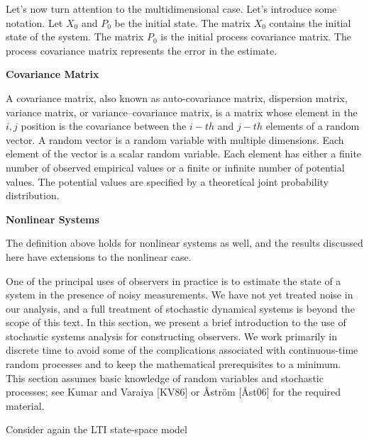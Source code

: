 Let's now turn attention to the multidimensional case. Let's introduce some notation. Let $X_0$ and $P_0$ be the initial state.
The matrix $X_0$ contains the initial state of the system. The matrix $P_0$ is the initial process covariance matrix. The process
covariance matrix represents the error in the estimate.


\begin{framed}
\theoremstyle{remark}
\begin{remark}{\textbf{Covariance Matrix}}

A covariance matrix, also known as auto-covariance matrix, dispersion matrix, variance matrix, or variance–covariance matrix, 
is a matrix whose element in the $i, j$ position is the covariance between the $i-th$ and $j-th$ elements of a random vector. 
A random vector is a random variable with multiple dimensions. 
Each element of the vector is a scalar random variable. 
Each element has either a finite number of observed empirical values or a finite or infinite number of potential values. 
The potential values are specified by a theoretical joint probability distribution. 
\end{remark}
\end{framed}



\begin{framed}
\theoremstyle{remark}
\begin{remark}{\textbf{Nonlinear Systems}}

The definition above holds for nonlinear systems as well, and the results discussed here have extensions to the nonlinear case.
\end{remark}
\end{framed}

One of the principal uses of observers in practice is to estimate the state of a
system in the presence of noisy measurements. We have not yet treated noise in our
analysis, and a full treatment of stochastic dynamical systems is beyond the scope
of this text. In this section, we present a brief introduction to the use of stochastic
systems analysis for constructing observers. We work primarily in discrete time to
avoid some of the complications associated with continuous-time random processes
and to keep the mathematical prerequisites to a minimum. This section assumes
basic knowledge of random variables and stochastic processes; see Kumar and
Varaiya [KV86] or Åström [Åst06] for the required material.

Consider again the LTI state-space model

